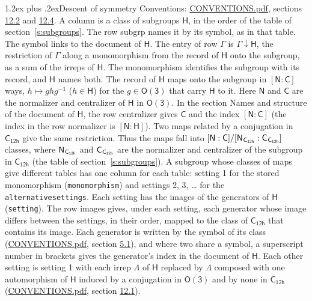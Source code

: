 \documentclass[10pt,a4paper]{article}
\makeatletter
\renewcommand\section{\@startsection{section}{1}{\z@}{-3ex plus -1ex minus -.2ex}%
  {1.2ex plus .2ex}{\normalfont\large\sffamily\bfseries\color{parttitle}}}
\numberwithin{equation}{section}
\newcommand{\grp}[1]{\mathsf{#1}}
\newcommand{\grpindex}[2]{[#1 : #2]}
\newcommand{\restr}[2]{#1\!\downarrow#2}
\newcommand{\hairsp}{\mkern1mu}
\makeatother
\begin{document}
\section{Descent of symmetry}\label{s:subduction}
Conventions: \href{../../CONVENTIONS.pdf}{CONVENTIONS.pdf}, sections \href{../../CONVENTIONS.pdf\#conv.12.2}{12.2} and \href{../../CONVENTIONS.pdf\#conv.12.4}{12.4}.
A column is a class of subgroups $\grp{H}$, in the order of the table of section~\ref{s:subgroups}. The row subgrp names it by its symbol, as in that table. The symbol links to the document of $\grp{H}$. The entry of row $\Gamma$ is $\restr{\Gamma}{\grp{H}}$, the restriction of $\Gamma$ along a monomorphism from the record of $\grp{H}$ onto the subgroup, as a sum of the irreps of $\grp{H}$. The monomorphism identifies the subgroup with its record, and $\grp{H}$ names both. \label{n:group.normalizer.o3}\label{n:group.centralizer.o3}The record of $\grp{H}$ maps onto the subgroup in $\grpindex{\grp{N}}{\grp{C}}$ ways, $h \mapsto g h g^{-1}$ ($h \in \grp{H}$) for the $g \in \grp{O(3)}$ that carry $\grp{H}$ to it. Here $\grp{N}$ and $\grp{C}$ are the normalizer and centralizer of $\grp{H}$ in \href{O3.pdf}{$\grp{O(3)}$}. In the section Names and structure of the document of $\grp{H}$, the row centralizer gives $\grp{C}$ and the index $\grpindex{\grp{N}}{\grp{C}}$ (the index in the row normalizer is $\grpindex{\grp{N}}{\grp{H}}$). Two maps related by a conjugation in $\grp{C_{12h}}$ give the same restriction. Thus the maps fall into $\grpindex{\grp{N}}{\grp{C}}/\grpindex{\grp{N}_{\hairsp \grp{C_{12h}}}}{\grp{C}_{\hairsp \grp{C_{12h}}}}$ classes, where $\grp{N}_{\hairsp \grp{C_{12h}}}$ and $\grp{C}_{\hairsp \grp{C_{12h}}}$ are the normalizer and centralizer of the subgroup in $\grp{C_{12h}}$ (the table of section~\ref{s:subgroups}). \label{n:head.setting}A subgroup whose classes of maps give different tables has one column for each table: setting 1 for the stored monomorphism (\texttt{monomorphism}) and settings 2, 3, \dots{} for the \texttt{alternativesettings}. Each setting has the images of the generators of $\grp{H}$ (\texttt{setting}). \label{n:head.images}The row images gives, under each setting, each generator whose image differs between the settings, in their order, mapped to the class of $\grp{C_{12h}}$ that contains its image. Each generator is written by the symbol of its class (\href{../../CONVENTIONS.pdf}{CONVENTIONS.pdf}, section \href{../../CONVENTIONS.pdf\#conv.5.1}{5.1}), and where two share a symbol, a superscript number in brackets gives the generator's index in the document of $\grp{H}$. \label{n:irrep.Delta}Each other setting is setting 1 with each irrep $\Lambda$ of $\grp{H}$ replaced by $\Lambda$ composed with one automorphism of $\grp{H}$ induced by a conjugation in \href{O3.pdf}{$\grp{O(3)}$} and by none in $\grp{C_{12h}}$ (\href{../../CONVENTIONS.pdf}{CONVENTIONS.pdf}, section \href{../../CONVENTIONS.pdf\#conv.12.1}{12.1}).
\end{document}
